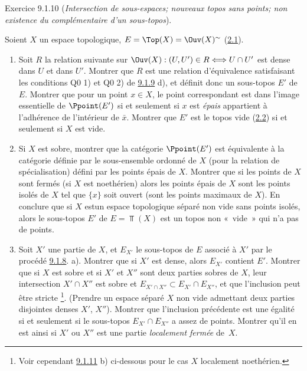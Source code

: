 \begin{enonce*}[remark]{Exercice 9.1.10}
(\emph{Intersection de sous-espaces; nouveaux topos sans points; non
existence du complémentaire d'un sous-topos}).

Soient $X$ un espace topologique, $E=\Top(X)=\Ouv(X)^{\sim}$
(\hyperref[IV.subsec2.1]{2.1}).

\begin{enumerate}
\renewcommand{\theenumi}{\alph{enumi}}
\renewcommand{\labelenumi}{\theenumi)}
\item Soit $R$ la relation suivante sur $\Ouv(X):(U,U')\in
R\Longleftrightarrow U\cap U'$ est dense dans $U$ et dans $U'$.
Montrer que $R$ est une relation d'équivalence satisfaisant les
conditions Q0 1) et Q0 2) de \hyperref[IV.exer9.1.9]{9.1.9} d), et définit donc
un sous-topos $E'$ de $E$. Montrer que pour un point $x\in X$, le
point correspondant est dans l'image essentielle de $\Ppoint(E')$ si
et seulement si $x$ est \emph{épais} \ie appartient à l'adhérence de
l'intérieur de $\bar{x}$. Montrer que $E'$ est le topos vide
(\hyperref[IV.subsec2.2]{2.2}) si et seulement si $X$ est vide.

\item Si $X$ est sobre, montrer que la catégorie $\Ppoint(E')$ est
équivalente à la catégorie définie par le sous-ensemble ordonné de
$X$ (pour la relation de spécialisation) défini par les points épais
de $X$. Montrer que si les points de $X$ sont fermés (\resp si $X$
est noethérien) alors les points épais de $X$ sont les points isolés
de $X$ \ie tel que $\{x\}$ soit ouvert (\resp sont les points
maximaux de $X$). En conclure que si $X$ est\pageoriginale un espace
topologique séparé non vide sans points isolés, alors le sous-topos
$E'$ de $E=\Top(X)$ est un topos non « vide »  qui n'a pas de
points.

\item Soit $X'$ une partie de $X$, et $E_{X'}$ le sous-topos de $E$
associé à $X'$ par le procédé \hyperref[IV.exer9.1.8]{9.1.8}. a). Montrer que si
$X'$ est dense, alors $E_{X'}$ contient $E'$. Montrer que si $X$ est
sobre et si $X'$ et $X''$ sont deux parties sobres de $X$, leur
intersection $X'\cap X''$ est sobre et $E_{X'\cap X''}\subset
E_{X'}\cap E_{X''}$, et que l'inclusion peut être stricte
\footnote[1]{Voir cependant \hyperref[IV.exer9.1.11]{9.1.11} b) ci-dessous pour
le cas $X$ localement noethérien.}. (Prendre un espace séparé $X$
non vide admettant deux parties disjointes denses $X'$, $X''$).
Montrer que l'inclusion précédente est une égalité si et seulement
si le sous-topos $E_{X'}\cap E_{X''}$ a assez de points. Montrer
qu'il en est ainsi si $X'$ ou $X''$ est une partie \emph{localement
fermée} de~$X$.


\end{enumerate}
\end{enonce*}
